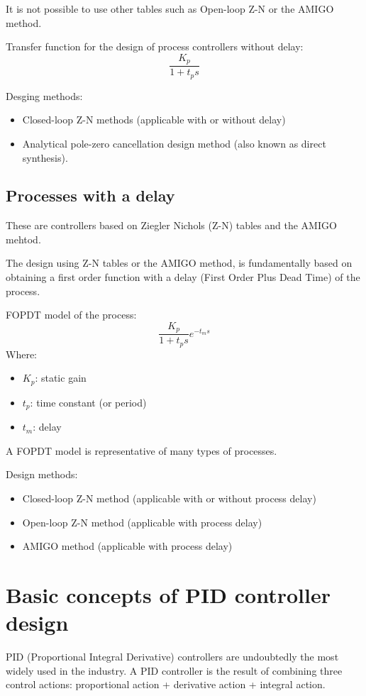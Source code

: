 It is not possible to use other tables such as Open-loop Z-N or the AMIGO method.

Transfer function for the design of process controllers without delay:
\[\frac{K_p}{1 + t_p s}\]

Desging methods:
\begin{itemize}
    \item Closed-loop Z-N methods (applicable with or without delay)
    \item Analytical pole-zero cancellation design method (also known as direct synthesis).
\end{itemize}

\subsection{Processes with a delay}
These are controllers based on Ziegler Nichols (Z-N) tables and the AMIGO mehtod.

The design using Z-N tables or the AMIGO method, is fundamentally based on obtaining a first order function with a delay (First Order Plus Dead Time) of the process.

FOPDT model of the process:
\[\frac{K_p}{1 + t_p s} e^{-t_m s}\]
Where:
\begin{itemize}
    \item $K_p$: static gain
    \item $t_p$: time constant (or period)
    \item $t_m$: delay
\end{itemize}
A FOPDT model is representative of many types of processes.

Design methods:
\begin{itemize}
    \item Closed-loop Z-N method (applicable with or without process delay)
    \item Open-loop Z-N method (applicable with process delay)
    \item AMIGO method (applicable with process delay)
\end{itemize}

\section{Basic concepts of PID controller design}

PID (Proportional Integral Derivative) controllers are undoubtedly the most widely used in the industry. A PID controller is the result of combining three control actions: proportional action + derivative action + integral action.

